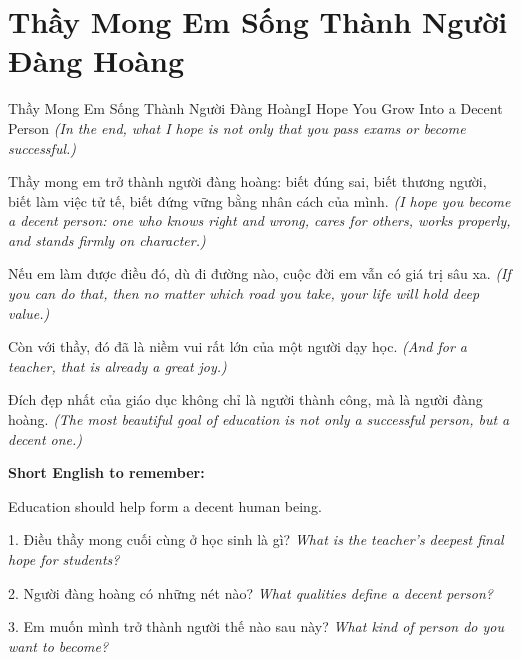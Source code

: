 \section{Thầy Mong Em Sống Thành Người Đàng Hoàng}
\begin{truyen}{Thầy Mong Em Sống Thành Người Đàng Hoàng}{I Hope You Grow Into a Decent Person}
\textit{(In the end, what I hope is not only that you pass exams or become successful.)}

Thầy mong em trở thành người đàng hoàng: biết đúng sai, biết thương người, biết làm việc tử tế, biết đứng vững bằng nhân cách của mình.
\textit{(I hope you become a decent person: one who knows right and wrong, cares for others, works properly, and stands firmly on character.)}

Nếu em làm được điều đó, dù đi đường nào, cuộc đời em vẫn có giá trị sâu xa.
\textit{(If you can do that, then no matter which road you take, your life will hold deep value.)}

Còn với thầy, đó đã là niềm vui rất lớn của một người dạy học.
\textit{(And for a teacher, that is already a great joy.)}
\end{truyen}

\begin{baihoc}
Đích đẹp nhất của giáo dục không chỉ là người thành công, mà là người đàng hoàng.
\textit{(The most beautiful goal of education is not only a successful person, but a decent one.)}
\end{baihoc}

\begin{ghinhoanh}
\textbf{Short English to remember:}

Education should help form a decent human being.

\end{ghinhoanh}

\begin{tuhocnhanh}
1. Điều thầy mong cuối cùng ở học sinh là gì? \textit{What is the teacher's deepest final hope for students?}

2. Người đàng hoàng có những nét nào? \textit{What qualities define a decent person?}

3. Em muốn mình trở thành người thế nào sau này? \textit{What kind of person do you want to become?}
\end{tuhocnhanh}
\ngancach

